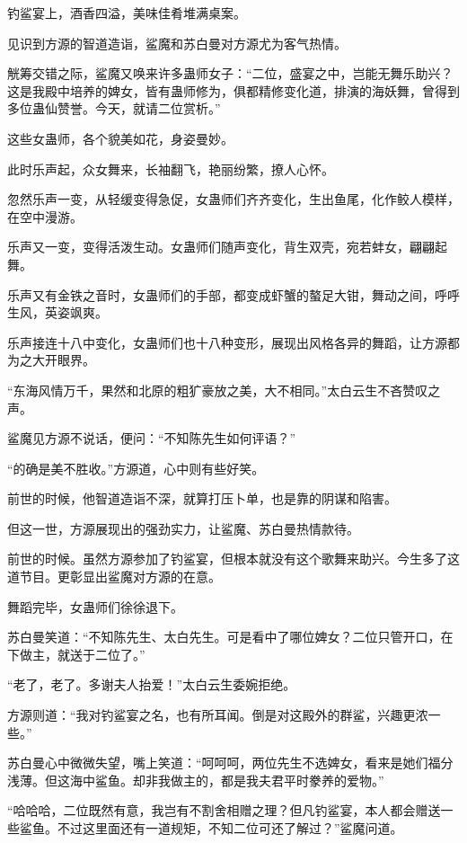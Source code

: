 
\begin{this_body}

钓鲨宴上，酒香四溢，美味佳肴堆满桌案。

见识到方源的智道造诣，鲨魔和苏白曼对方源尤为客气热情。

觥筹交错之际，鲨魔又唤来许多蛊师女子：“二位，盛宴之中，岂能无舞乐助兴？这是我殿中培养的婢女，皆有蛊师修为，俱都精修变化道，排演的海妖舞，曾得到多位蛊仙赞誉。今天，就请二位赏析。”

这些女蛊师，各个貌美如花，身姿曼妙。

此时乐声起，众女舞来，长袖翻飞，艳丽纷繁，撩人心怀。

忽然乐声一变，从轻缓变得急促，女蛊师们齐齐变化，生出鱼尾，化作鲛人模样，在空中漫游。

乐声又一变，变得活泼生动。女蛊师们随声变化，背生双壳，宛若蚌女，翩翩起舞。

乐声又有金铁之音时，女蛊师们的手部，都变成虾蟹的螯足大钳，舞动之间，呼呼生风，英姿飒爽。

乐声接连十八中变化，女蛊师们也十八种变形，展现出风格各异的舞蹈，让方源都为之大开眼界。

“东海风情万千，果然和北原的粗犷豪放之美，大不相同。”太白云生不吝赞叹之声。

鲨魔见方源不说话，便问：“不知陈先生如何评语？”

“的确是美不胜收。”方源道，心中则有些好笑。

前世的时候，他智道造诣不深，就算打压卜单，也是靠的阴谋和陷害。

但这一世，方源展现出的强劲实力，让鲨魔、苏白曼热情款待。

前世的时候。虽然方源参加了钓鲨宴，但根本就没有这个歌舞来助兴。今生多了这道节目。更彰显出鲨魔对方源的在意。

舞蹈完毕，女蛊师们徐徐退下。

苏白曼笑道：“不知陈先生、太白先生。可是看中了哪位婢女？二位只管开口，在下做主，就送于二位了。”

“老了，老了。多谢夫人抬爱！”太白云生委婉拒绝。

方源则道：“我对钓鲨宴之名，也有所耳闻。倒是对这殿外的群鲨，兴趣更浓一些。”

苏白曼心中微微失望，嘴上笑道：“呵呵呵，两位先生不选婢女，看来是她们福分浅薄。但这海中鲨鱼。却非我做主的，都是我夫君平时豢养的爱物。”

“哈哈哈，二位既然有意，我岂有不割舍相赠之理？但凡钓鲨宴，本人都会赠送一些鲨鱼。不过这里面还有一道规矩，不知二位可还了解过？”鲨魔问道。


\end{this_body}
